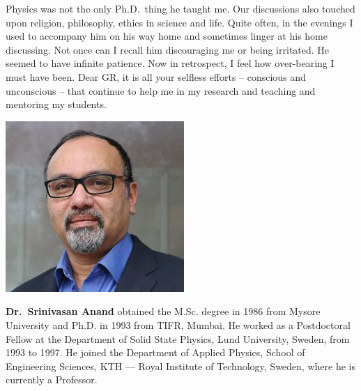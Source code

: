 Physics was not the only Ph.D.\ thing he taught me. Our discussions also touched upon religion, philosophy, ethics in science and life. Quite often, in the evenings I used to accompany him on his way home and sometimes linger at his home discussing. Not once can I recall him discouraging me or being irritated. He seemed to have infinite patience. Now in retrospect, I feel how over-bearing I must have been. Dear GR, it is all your selfless efforts – conscious and unconscious – that continue to help me in my research and teaching and mentoring my students.
\bigskip

\centerline{\includegraphics[scale=0.5]{figures/authors/Prof_Srinivasan_Anand.jpg}}
\smallskip

\bigskip

\noindent
\textbf{Dr.~Srinivasan Anand} obtained the M.Sc. degree in 1986 from Mysore University and Ph.D. in 1993 from TIFR, Mumbai. He worked as a Postdoctoral Fellow at the Department of Solid State Physics, Lund University, Sweden, from 1993 to 1997. He joined the Department of Applied Physics, School of Engineering Sciences, KTH --- Royal Institute of Technology, Sweden, where he is currently a Professor.
